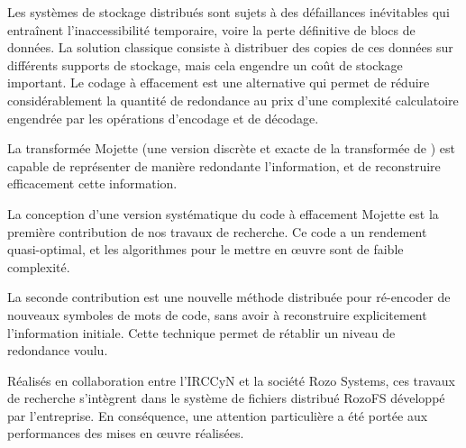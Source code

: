 
Les systèmes de stockage distribués sont sujets à des défaillances inévitables
qui entraînent l'inaccessibilité temporaire, voire la perte définitive de blocs
de données. La solution classique consiste à distribuer des copies de ces
données sur différents supports de stockage, mais cela engendre un coût de
stockage important.
%
Le codage à effacement est une alternative qui permet de réduire
considérablement la quantité de redondance au prix d'une complexité
calculatoire engendrée par les opérations d'encodage et de décodage.

La transformée Mojette (une version discrète et exacte de la transformée
de \radon) est capable de représenter de manière redondante l'information,
et de reconstruire efficacement cette information. %

La conception d'une version systématique du code à effacement Mojette est la
première contribution de nos travaux de recherche. Ce code a un rendement
quasi-optimal, et les algorithmes pour le mettre en œuvre sont de faible
complexité.

La seconde contribution est une nouvelle méthode distribuée pour ré-encoder de
nouveaux symboles de mots de code, sans avoir à reconstruire explicitement
l'information initiale. Cette technique permet de rétablir un niveau de
redondance voulu.

Réalisés en collaboration entre l'IRCCyN et la société Rozo Systems, ces
travaux de recherche s'intègrent dans le système de fichiers
distribué RozoFS développé par l'entreprise. En conséquence, une attention
particulière a été portée aux performances des mises en œuvre réalisées.

